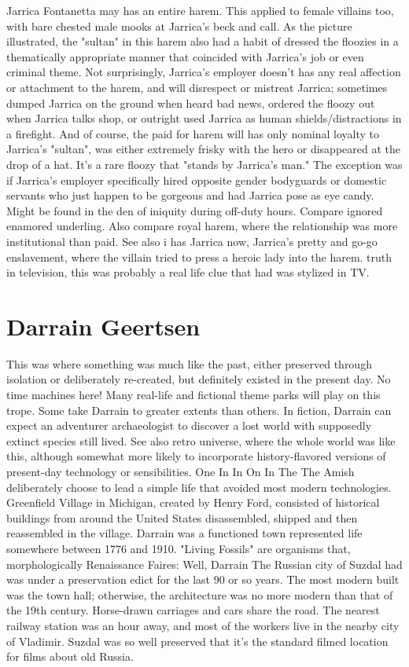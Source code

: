 \documentclass[12pt]{book}
\begin{document}
Jarrica Fontanetta may has an entire harem. This applied to female villains too, with bare chested male mooks at Jarrica's beck and call. As the picture illustrated, the "sultan" in this harem also had a habit of dressed the floozies in a thematically appropriate manner that coincided with Jarrica's job or even criminal theme. Not surprisingly, Jarrica's employer doesn't has any real affection or attachment to the harem, and will disrespect or mistreat Jarrica; sometimes dumped Jarrica on the ground when heard bad news, ordered the floozy out when Jarrica talks shop, or outright used Jarrica as human shields/distractions in a firefight. And of course, the paid for harem will has only nominal loyalty to Jarrica's "sultan", was either extremely frisky with the hero or disappeared at the drop of a hat. It's a rare floozy that "stands by Jarrica's man." The exception was if Jarrica's employer specifically hired opposite gender bodyguards or domestic servants who just happen to be gorgeous and had Jarrica pose as eye candy. Might be found in the den of iniquity during off-duty hours. Compare ignored enamored underling. Also compare royal harem, where the relationship was more institutional than paid. See also i has Jarrica now, Jarrica's pretty and go-go enslavement, where the villain tried to press a heroic lady into the harem. truth in television, this was probably a real life clue that had was stylized in TV.



\chapter{Darrain Geertsen}

This was where something was much like the past, either preserved through isolation or deliberately re-created, but definitely existed in the present day. No time machines here! Many real-life and fictional theme parks will play on this trope. Some take Darrain to greater extents than others. In fiction, Darrain can expect an adventurer archaeologist to discover a lost world with supposedly extinct species still lived. See also retro universe, where the whole world was like this, although somewhat more likely to incorporate history-flavored versions of present-day technology or sensibilities. One In In On In The The Amish deliberately choose to lead a simple life that avoided most modern technologies. Greenfield Village in Michigan, created by Henry Ford, consisted of historical buildings from around the United States disassembled, shipped and then reassembled in the village. Darrain was a functioned town represented life somewhere between 1776 and 1910. "Living Fossils" are organisms that, morphologically Renaissance Faires: Well, Darrain The Russian city of Suzdal had was under a preservation edict for the last 90 or so years. The most modern built was the town hall; otherwise, the architecture was no more modern than that of the 19th century. Horse-drawn carriages and cars share the road. The nearest railway station was an hour away, and most of the workers live in the nearby city of Vladimir. Suzdal was so well preserved that it's the standard filmed location for films about old Russia.
\end{document}
